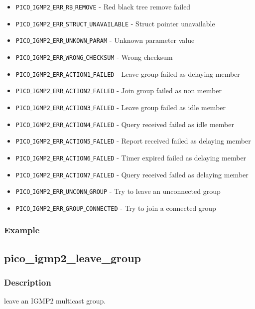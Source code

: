 \begin{itemize}
\item \texttt{PICO$\_$IGMP2$\_$ERR$\_$RB$\_$REMOVE}          - Red black tree remove failed 
\item \texttt{PICO$\_$IGMP2$\_$ERR$\_$STRUCT$\_$UNAVAILABLE} - Struct pointer unavailable 
\item \texttt{PICO$\_$IGMP2$\_$ERR$\_$UNKOWN$\_$PARAM}       - Unknown parameter value 
\item \texttt{PICO$\_$IGMP2$\_$ERR$\_$WRONG$\_$CHECKSUM}     - Wrong checksum  
\item \texttt{PICO$\_$IGMP2$\_$ERR$\_$ACTION1$\_$FAILED}     - Leave group failed as delaying member
\item \texttt{PICO$\_$IGMP2$\_$ERR$\_$ACTION2$\_$FAILED}     - Join group failed as non member
\item \texttt{PICO$\_$IGMP2$\_$ERR$\_$ACTION3$\_$FAILED}     - Leave group failed as idle member 
\item \texttt{PICO$\_$IGMP2$\_$ERR$\_$ACTION4$\_$FAILED}     - Query received failed as idle member
\item \texttt{PICO$\_$IGMP2$\_$ERR$\_$ACTION5$\_$FAILED}     - Report received failed as delaying member
\item \texttt{PICO$\_$IGMP2$\_$ERR$\_$ACTION6$\_$FAILED}     - Timer expired failed as delaying member
\item \texttt{PICO$\_$IGMP2$\_$ERR$\_$ACTION7$\_$FAILED}     - Query received failed as delaying member
\item \texttt{PICO$\_$IGMP2$\_$ERR$\_$UNCONN$\_$GROUP}       - Try to leave an unconnected group
\item \texttt{PICO$\_$IGMP2$\_$ERR$\_$GROUP$\_$CONNECTED}    - Try to join a connected group 
\end{itemize}


\subsubsection*{Example}


\subsection{pico\_igmp2\_leave\_group}

\subsubsection*{Description}
leave an IGMP2 multicast group.

